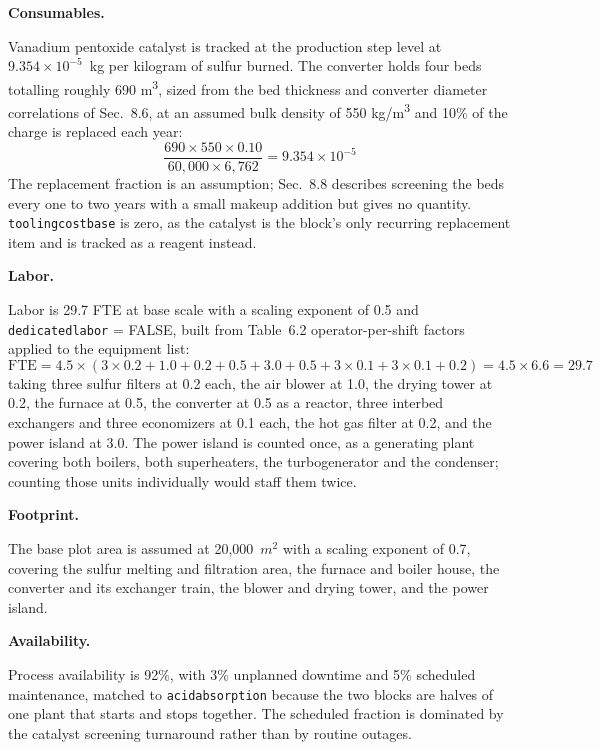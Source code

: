 \documentclass{article}
\renewcommand\_{\textunderscore\allowbreak}
\begin{document}
\medskip
\noindent\textbf{Consumables.}\quad
 
Vanadium pentoxide catalyst is tracked at the production step level at $9.354\times10^{-5}$~kg per kilogram of sulfur burned. The converter holds four beds totalling roughly 690 \si{m^3}, sized from the bed thickness and converter diameter correlations of \citet{davenportSulfuricAcidManufacture2006} Sec.~8.6, at an assumed bulk density of 550 \si{kg/m^3} and 10\% of the charge is replaced each year:
\[
    \frac{690 \times 550 \times 0.10}{60,000 \times 6,762} = 9.354\times10^{-5}
\]
The replacement fraction is an assumption; Sec.~8.8 describes screening the beds every one to two years with a small makeup addition but gives no quantity. \texttt{tooling\_cost\_base} is zero, as the catalyst is the block's only recurring replacement item and is tracked as a reagent instead.
 
\medskip
\noindent\textbf{Labor.}\quad
 
Labor is 29.7 FTE at base scale with a scaling exponent of 0.5 and \texttt{dedicated\_labor} = FALSE, built from \citet{ulrichChemicalEngineeringProcess2004} Table~6.2 operator-per-shift factors applied to the equipment list:
\[
    \text{FTE} = 4.5 \times (3 \times 0.2 + 1.0 + 0.2 + 0.5 + 3.0 + 0.5 + 3 \times 0.1 + 3 \times 0.1 + 0.2) = 4.5 \times 6.6 = 29.7
\]
taking three sulfur filters at 0.2 each, the air blower at 1.0, the drying tower at 0.2, the furnace at 0.5, the converter at 0.5 as a reactor, three interbed exchangers and three economizers at 0.1 each, the hot gas filter at 0.2, and the power island at 3.0. The power island is counted once, as a generating plant covering both boilers, both superheaters, the turbogenerator and the condenser; counting those units individually would staff them twice.
 
\medskip
\noindent\textbf{Footprint.}\quad
 
The base plot area is assumed at 20,000~$\si{m^2}$ with a scaling exponent of 0.7, covering the sulfur melting and filtration area, the furnace and boiler house, the converter and its exchanger train, the blower and drying tower, and the power island.
 
\medskip
\noindent\textbf{Availability.}\quad
 
Process availability is 92\%, with 3\% unplanned downtime and 5\% scheduled maintenance, matched to \texttt{acid\_absorption} because the two blocks are halves of one plant that starts and stops together. The scheduled fraction is dominated by the catalyst screening turnaround rather than by routine outages.
 
\end{document}
